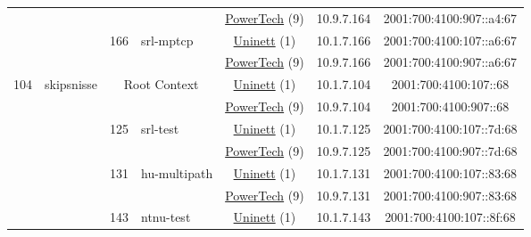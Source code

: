 \begin{small}
\begin{center}
\begin{longtable}{|c|c|c|c|c|c|c|c|}
  &  &  &  & \multicolumn{2}{|c|}{\tiny{\href{http://www.powertech.no}{PowerTech} (9)}} & \tiny{10.9.7.164} & \tiny{2001:700:4100:907::a4:67} \\* \cline{3-3}\cline{4-4}\cline{5-5}\cline{6-6}\cline{7-7}\cline{8-8}
  &  & \multirow{2}{*}{\tiny{166}} & \multicolumn{1}{|l|}{\multirow{2}{*}{\tiny{srl-mptcp}}} & \multicolumn{2}{|c|}{\tiny{\href{https://www.uninett.no}{Uninett} (1)}} & \tiny{10.1.7.166} & \tiny{2001:700:4100:107::a6:67} \\* \cline{5-5}\cline{6-6}\cline{7-7}\cline{8-8}
  &  &  &  & \multicolumn{2}{|c|}{\tiny{\href{http://www.powertech.no}{PowerTech} (9)}} & \tiny{10.9.7.166} & \tiny{2001:700:4100:907::a6:67} \\ \hline
 \multirow{10}{*}{\tiny{104}} & \multicolumn{1}{|l|}{\multirow{10}{*}{\tiny{skipsnisse}}} & \multicolumn{2}{|c|}{\multirow{2}{*}{\tiny{Root Context}}} & \multicolumn{2}{|c|}{\tiny{\href{https://www.uninett.no}{Uninett} (1)}} & \tiny{10.1.7.104} & \tiny{2001:700:4100:107::68} \\* \cline{5-5}\cline{6-6}\cline{7-7}\cline{8-8}
  &  & \multicolumn{2}{|c|}{} & \multicolumn{2}{|c|}{\tiny{\href{http://www.powertech.no}{PowerTech} (9)}} & \tiny{10.9.7.104} & \tiny{2001:700:4100:907::68} \\* \cline{3-3}\cline{4-4}\cline{5-5}\cline{6-6}\cline{7-7}\cline{8-8}
  &  & \multirow{2}{*}{\tiny{125}} & \multicolumn{1}{|l|}{\multirow{2}{*}{\tiny{srl-test}}} & \multicolumn{2}{|c|}{\tiny{\href{https://www.uninett.no}{Uninett} (1)}} & \tiny{10.1.7.125} & \tiny{2001:700:4100:107::7d:68} \\* \cline{5-5}\cline{6-6}\cline{7-7}\cline{8-8}
  &  &  &  & \multicolumn{2}{|c|}{\tiny{\href{http://www.powertech.no}{PowerTech} (9)}} & \tiny{10.9.7.125} & \tiny{2001:700:4100:907::7d:68} \\* \cline{3-3}\cline{4-4}\cline{5-5}\cline{6-6}\cline{7-7}\cline{8-8}
  &  & \multirow{2}{*}{\tiny{131}} & \multicolumn{1}{|l|}{\multirow{2}{*}{\tiny{hu-multipath}}} & \multicolumn{2}{|c|}{\tiny{\href{https://www.uninett.no}{Uninett} (1)}} & \tiny{10.1.7.131} & \tiny{2001:700:4100:107::83:68} \\* \cline{5-5}\cline{6-6}\cline{7-7}\cline{8-8}
  &  &  &  & \multicolumn{2}{|c|}{\tiny{\href{http://www.powertech.no}{PowerTech} (9)}} & \tiny{10.9.7.131} & \tiny{2001:700:4100:907::83:68} \\* \cline{3-3}\cline{4-4}\cline{5-5}\cline{6-6}\cline{7-7}\cline{8-8}
  &  & \multirow{2}{*}{\tiny{143}} & \multicolumn{1}{|l|}{\multirow{2}{*}{\tiny{ntnu-test}}} & \multicolumn{2}{|c|}{\tiny{\href{https://www.uninett.no}{Uninett} (1)}} & \tiny{10.1.7.143} & \tiny{2001:700:4100:107::8f:68} \\* \cline{5-5}\cline{6-6}\cline{7-7}\cline{8-8}

\end{longtable}
\end{center}
\end{small}
